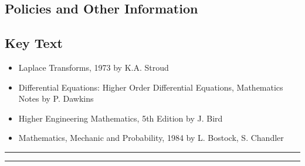 
\subsection*{Policies and Other Information}
\subsection*{Key Text}
\begin{itemize}
    \item Laplace Transforms, 1973 by K.A. Stroud
    \item Differential Equations: Higher Order Differential Equations, Mathematics Notes by P. Dawkins
    \item Higher Engineering Mathematics, 5th Edition by J. Bird
    \item Mathematics, Mechanic and Probability, 1984 by L. Bostock, S. Chandler
\end{itemize}
\vspace{2ex}\hrule
\vspace{2ex}\hrule\vspace{2ex}